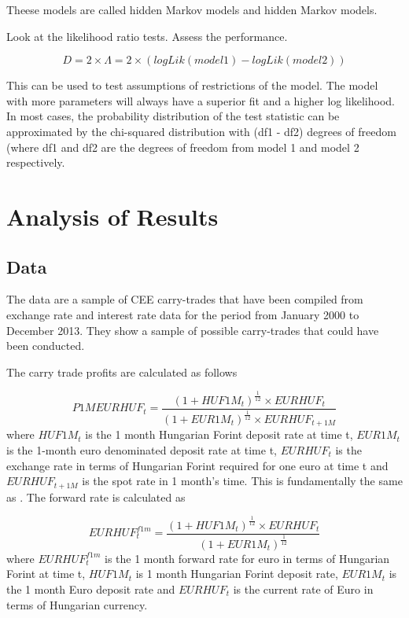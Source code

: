 \documentclass[12pt, a4paper, oneside]{article} %
\begin{document}
Theese models are called hidden Markov models and hidden Markov models.

Look at the likelihood ratio tests.  Assess the performance. 

\begin{equation}
D = 2 \times \Lambda = 2 \times (logLik(model 1) - logLik(model 2))
\end{equation}

This can be used to test assumptions of restrictions of the model. The model with more parameters will always have a superior fit and a higher log likelihood.  In most cases, the probability distribution of the test statistic can be approximated by the chi-squared distribution with (df1 - df2) degrees of freedom (where df1 and df2 are the degrees of freedom from model 1 and model 2 respectively.





\section{Analysis of Results}
\subsection{Data}
The data are a sample of CEE carry-trades that have been compiled from exchange rate and interest rate data for the period from January 2000 to December 2013.  They show a sample of possible carry-trades that could have been conducted. 

The carry trade profits are calculated as follows

\begin{equation}\label{eqref:carryprofit}
P1MEURHUF_t = \frac{(1 + HUF1M_t)^{\frac{1}{12}} \times EURHUF_t }{(1 + EUR1M_t)^{\frac{1}{12}} \times EURHUF_{t+1M}}
\end{equation}
where $HUF1M_t$ is the 1 month Hungarian Forint deposit rate at time t, $EUR1M_t$ is the 1-month euro denominated deposit rate at time t, $EURHUF_t$ is the exchange rate in terms of  Hungarian Forint required for one euro at time t and  $EURHUF_{t+1M}$ is the spot rate in 1 month's time.  This is fundamentally the same as \citep{BrunnermeierCarry}. The forward rate is calculated as

\begin{equation}\label{eqref:forward}
EURHUF_t^{f1m} = \frac{(1 + HUF1M_t)^{\frac{1}{12}} \times EURHUF_t }{(1 + EUR1M_t)^{\frac{1}{12}}}
\end{equation}
where  $EURHUF_t^{f1m}$ is the 1 month forward rate for euro in terms of Hungarian Forint at time t, $HUF1M_t$ is 1 month Hungarian Forint deposit rate, $EUR1M_t$ is the 1 month Euro deposit rate and $EURHUF_t$ is the current rate of Euro in terms of Hungarian currency.  
\end{document}
